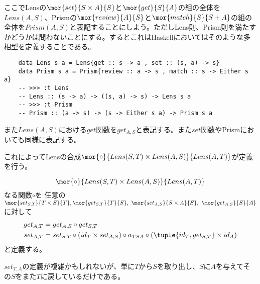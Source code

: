 \documentclass[uplatex,dvipdfmx]{jsarticle}
\begin{document}
  ここでLensの$\mor{set}{S\times A}{S}$と$\mor{get}{S}{A}$の組の全体を$Lens(A,S)$、Prismの$\mor{review}{A}{S}$と$\mor{match}{S}{S+A}$の組の全体を$Prism(A,S)$と表記することにしよう。ただしLens則、Prism則を満たすかどうかは問わないことにする。するとこれはHaskellにおいてはそのような多相型を定義することである。
  \begin{lstlisting}
    data Lens s a = Lens{get :: s -> a , set :: (s, a) -> s}
    data Prism s a = Prism{review :: a -> s , match :: s -> Either s a}
    -- >>> :t Lens
    -- Lens :: (s -> a) -> ((s, a) -> s) -> Lens s a
    -- >>> :t Prism
    -- Prism :: (a -> s) -> (s -> Either s a) -> Prism s a
  \end{lstlisting}

  また$Lens(A,S)$における$get$関数を$get_{A,S}$と表記する。また$set$関数やPrismにおいても同様に表記する。
  
  これによってLensの合成$\mor{\circ}{Lens(S,T)\times Lens(A,S)}{Lens(A,T)}$が定義を行う。
  \begin{define}\label{def-comp-of-lens}
    \[\mor{\circ}{Lens(S,T)\times Lens(A,S)}{Lens(A,T)}\]なる関数$\circ$を
    任意の$\mor{set_{S,T}}{T\times S}{T}, \mor{get_{S,T}}{T}{S},\ \mor{set_{A,S}}{S\times A}{S},\ \mor{get_{A,S}}{S}{A}$に対して
    \begin{align*}
      get_{A,T}&=get_{A,S}\circ get_{S,T}\\
      set_{A,T}&=set_{S,T}\circ(id_T\times set_{A,S})\circ a_{TSA}\circ(\tuple{id_T, get_{S,T}}\times id_A)
    \end{align*}
    と定義する。
    \begin{center}
    \end{center}
  \end{define}
  $set_{T,A}$の定義が複雑かもしれないが、単に$T$から$S$を取り出し、$S$に$A$を与えてその$S$をまた$T$に戻しているだけである。
\end{document}
